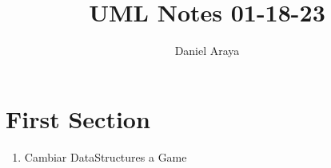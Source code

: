 \documentclass{article}
\title{\Huge UML Notes 01-18-23}
\author{\Huge Daniel Araya}
\begin{document}
    \maketitle
    
    \newpage
    \section{First Section}


    \begin{enumerate}
        \item Cambiar DataStructures a Game
    \end{enumerate}
\end{document}
